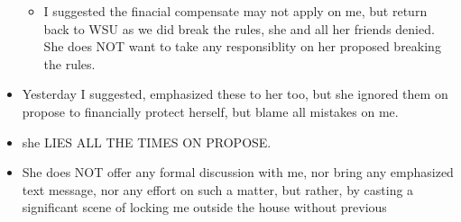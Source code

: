 \documentclass[9pt, b5paper]{article}
\begin{document}
\begin{itemize}
\begin{itemize}
\item I suggested the finacial compensate may not apply on me, but return back to WSU as we did break the rules, she and all her friends denied. She does NOT want to take any responsiblity on her proposed breaking the rules.
\end{itemize}
\item Yesterday I suggested, emphasized these to her too, but she ignored them on propose to financially protect herself, but blame all mistakes on me.
\item she LIES ALL THE TIMES ON PROPOSE.
\item She does NOT offer any formal discussion with me, nor bring any emphasized text message, nor any effort on such a matter, but rather, by casting a significant scene of locking me outside the house without previous
\end{itemize}
\end{document}
